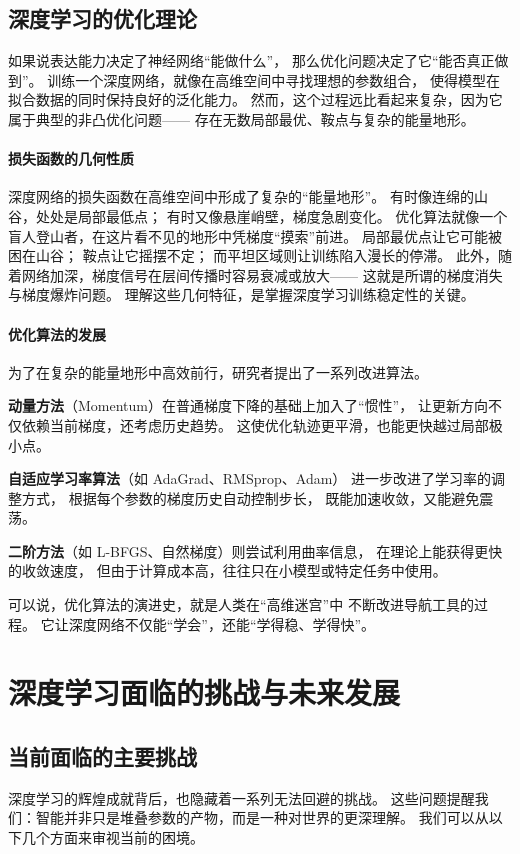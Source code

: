 \subsection{深度学习的优化理论}

如果说表达能力决定了神经网络“能做什么”，  
那么优化问题决定了它“能否真正做到”。  
训练一个深度网络，就像在高维空间中寻找理想的参数组合，  
使得模型在拟合数据的同时保持良好的泛化能力。  
然而，这个过程远比看起来复杂，因为它属于典型的非凸优化问题——  
存在无数局部最优、鞍点与复杂的能量地形。

\paragraph{损失函数的几何性质}  
深度网络的损失函数在高维空间中形成了复杂的“能量地形”。  
有时像连绵的山谷，处处是局部最低点；  
有时又像悬崖峭壁，梯度急剧变化。  
优化算法就像一个盲人登山者，在这片看不见的地形中凭梯度“摸索”前进。  
局部最优点让它可能被困在山谷；  
鞍点让它摇摆不定；  
而平坦区域则让训练陷入漫长的停滞。  
此外，随着网络加深，梯度信号在层间传播时容易衰减或放大——  
这就是所谓的梯度消失与梯度爆炸问题。  
理解这些几何特征，是掌握深度学习训练稳定性的关键。

\paragraph{优化算法的发展}  
为了在复杂的能量地形中高效前行，研究者提出了一系列改进算法。  

{\bf 动量方法}（Momentum）在普通梯度下降的基础上加入了“惯性”，  
让更新方向不仅依赖当前梯度，还考虑历史趋势。  
这使优化轨迹更平滑，也能更快越过局部极小点。  

{\bf 自适应学习率算法}（如 AdaGrad、RMSprop、Adam）  
进一步改进了学习率的调整方式，  
根据每个参数的梯度历史自动控制步长，  
既能加速收敛，又能避免震荡。  

{\bf 二阶方法}（如 L-BFGS、自然梯度）则尝试利用曲率信息，  
在理论上能获得更快的收敛速度，  
但由于计算成本高，往往只在小模型或特定任务中使用。  

可以说，优化算法的演进史，就是人类在“高维迷宫”中  
不断改进导航工具的过程。  
它让深度网络不仅能“学会”，还能“学得稳、学得快”。

\section{深度学习面临的挑战与未来发展}

\subsection{当前面临的主要挑战}
深度学习的辉煌成就背后，也隐藏着一系列无法回避的挑战。  
这些问题提醒我们：智能并非只是堆叠参数的产物，而是一种对世界的更深理解。  
我们可以从以下几个方面来审视当前的困境。  

